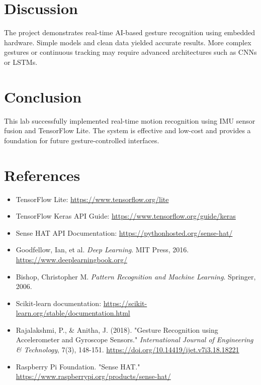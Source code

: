 \documentclass[a4paper,12pt]{article}
\begin{document}
\section{Discussion}
The project demonstrates real-time AI-based gesture recognition using embedded hardware. Simple models and clean data yielded accurate results. More complex gestures or continuous tracking may require advanced architectures such as CNNs or LSTMs.

\section{Conclusion}
This lab successfully implemented real-time motion recognition using IMU sensor fusion and TensorFlow Lite. The system is effective and low-cost and provides a foundation for future gesture-controlled interfaces.

\section{References}
\begin{itemize}
    \item TensorFlow Lite: \url{https://www.tensorflow.org/lite}
    \item TensorFlow Keras API Guide: \url{https://www.tensorflow.org/guide/keras}
    \item Sense HAT API Documentation: \url{https://pythonhosted.org/sense-hat/}
    \item Goodfellow, Ian, et al. \textit{Deep Learning}. MIT Press, 2016. \url{https://www.deeplearningbook.org/}
    \item Bishop, Christopher M. \textit{Pattern Recognition and Machine Learning}. Springer, 2006.
    \item Scikit-learn documentation: \url{https://scikit-learn.org/stable/documentation.html}
    \item Rajalakshmi, P., \& Anitha, J. (2018). "Gesture Recognition using Accelerometer and Gyroscope Sensors." \textit{International Journal of Engineering \& Technology}, 7(3), 148-151. \url{https://doi.org/10.14419/ijet.v7i3.18.18221}
    \item Raspberry Pi Foundation. "Sense HAT." \url{https://www.raspberrypi.org/products/sense-hat/}
\end{itemize}
\end{document}
